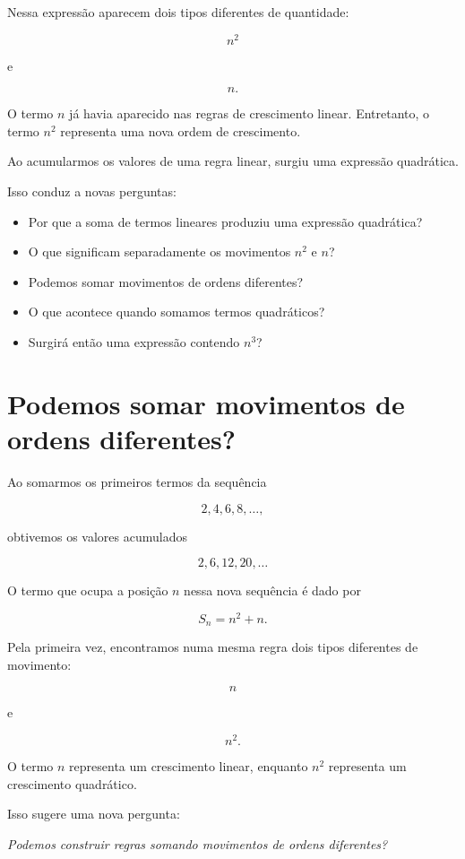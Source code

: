 \documentclass[12pt,a4paper]{article}
\begin{document}
Nessa expressão aparecem dois tipos diferentes de quantidade:

\[
n^2
\]

e

\[
n.
\]

O termo \(n\) já havia aparecido nas regras de crescimento linear.
Entretanto, o termo \(n^2\) representa uma nova ordem de crescimento.

Ao acumularmos os valores de uma regra linear, surgiu uma expressão
quadrática.

Isso conduz a novas perguntas:

\begin{itemize}
    \item Por que a soma de termos lineares produziu uma expressão
    quadrática?
    \item O que significam separadamente os movimentos \(n^2\) e \(n\)?
    \item Podemos somar movimentos de ordens diferentes?
    \item O que acontece quando somamos termos quadráticos?
    \item Surgirá então uma expressão contendo \(n^3\)?
\end{itemize}
\section{Podemos somar movimentos de ordens diferentes?}

Ao somarmos os primeiros termos da sequência

\[
2,4,6,8,\ldots,
\]

obtivemos os valores acumulados

\[
2,6,12,20,\ldots
\]

O termo que ocupa a posição \(n\) nessa nova sequência é dado por

\[
S_n=n^2+n.
\]

Pela primeira vez, encontramos numa mesma regra dois tipos diferentes
de movimento:

\[
n
\]

e

\[
n^2.
\]

O termo \(n\) representa um crescimento linear, enquanto \(n^2\)
representa um crescimento quadrático.

Isso sugere uma nova pergunta:

\begin{center}
\emph{Podemos construir regras somando movimentos de ordens diferentes?}
\end{center}
\end{document}
